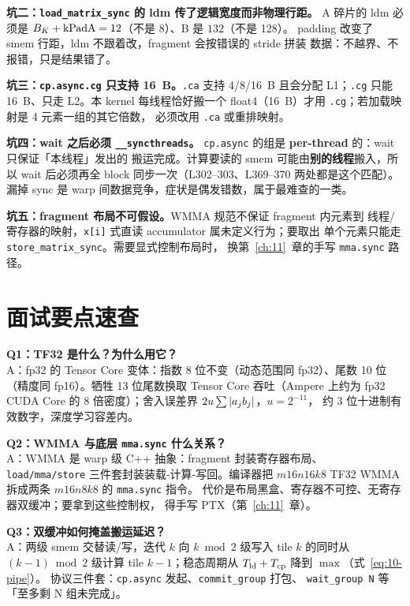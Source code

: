 \textbf{坑二：\texttt{load\_\allowbreak{}matrix\_\allowbreak{}sync} 的 ldm 传了逻辑宽度而非物理行距。}
A 碎片的 ldm 必须是 $B\sb K+\mathrm{kPadA}=12$（不是 8）、B 是 $132$（不是 128）。
padding 改变了 smem 行距，ldm 不跟着改，fragment 会按错误的 stride 拼装
数据：不越界、不报错，只是结果错了。

\textbf{坑三：\texttt{cp.async.cg} 只支持 16~B。}\texttt{.ca} 支持 4/8/16~B
且会分配 L1；\texttt{.cg} 只能 16~B、只走 L2。本 kernel 每线程恰好搬一个
float4（16~B）才用 \texttt{.cg}；若加载映射是 4 元素一组的其它倍数，
必须改用 \texttt{.ca} 或重排映射。

\textbf{坑四：wait 之后必须 \texttt{\_\allowbreak{}\_\allowbreak{}syncthreads}。}
\texttt{cp.async} 的组是 \textbf{per-thread} 的：wait 只保证「本线程」发出的
搬运完成。计算要读的 smem 可能由\textbf{别的线程}搬入，所以
wait 后必须再全 block 同步一次（L302--303、L369--370 两处都是这个匹配）。
漏掉 sync 是 warp 间数据竞争，症状是偶发错数，属于最难查的一类。

\textbf{坑五：fragment 布局不可假设。}\allowbreak{}WMMA 规范不保证 fragment 内元素到
线程/寄存器的映射，\texttt{x[i]} 式直读 accumulator 属未定义行为；要取出
单个元素只能走 \texttt{store\_\allowbreak{}matrix\_\allowbreak{}sync}。需要显式控制布局时，
换第~\ref{ch:11}~章的手写 \texttt{mma.sync} 路径。

\section{面试要点速查}

\textbf{Q1：TF32 是什么？为什么用它？}\\
A：fp32 的 Tensor Core 变体：指数 8 位不变（动态范围同 fp32）、尾数 10 位
（精度同 fp16）。牺牲 13 位尾数换取 Tensor Core 吞吐（Ampere 上约为 fp32
CUDA Core 的 8 倍密度）；舍入误差界 $2u\sum|a\sb jb\sb j|$，$u = 2^{-11}$，
约 3 位十进制有效数字，深度学习容差内。

\textbf{Q2：WMMA 与底层 \texttt{mma.sync} 什么关系？}\\
A：WMMA 是 warp 级 C++ 抽象：fragment 封装寄存器布局、
\texttt{load/\allowbreak{}mma/\allowbreak{}store} 三件套封装装载-计算-写回。编译器把
$m16n16k8$ TF32 WMMA 拆成两条 $m16n8k8$ 的 \texttt{mma.sync} 指令。
代价是布局黑盒、寄存器不可控、无寄存器双缓冲；要拿到这些控制权，
得手写 PTX（第~\ref{ch:11}~章）。

\textbf{Q3：双缓冲如何掩盖搬运延迟？}\\
A：两级 smem 交替读/写，迭代 $k$ 向 $k\bmod2$ 级写入 tile $k$ 的同时从
$(k{-}1)\bmod2$ 级计算 tile $k{-}1$；稳态周期从
$T\sb {\mathrm{ld}}+T\sb {\mathrm{cp}}$ 降到 $\max$（式~\ref{eq:10-pipe}）。
协议三件套：\texttt{cp.async} 发起、\texttt{commit\_\allowbreak{}group} 打包、
\texttt{wait\_group N} 等「至多剩 N 组未完成」。

